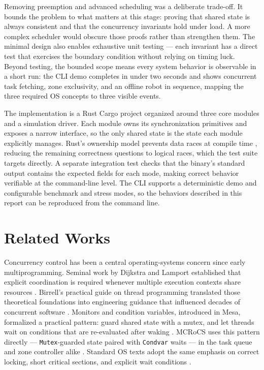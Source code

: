 \documentclass[11pt]{article}
\begin{document}
Removing preemption and advanced scheduling was a deliberate trade-off. It bounds the problem to what matters at this stage: proving that shared state is always consistent and that the concurrency invariants hold under load. A more complex scheduler would obscure those proofs rather than strengthen them. The minimal design also enables exhaustive unit testing --- each invariant has a direct test that exercises the boundary condition without relying on timing luck. Beyond testing, the bounded scope means every system behavior is observable in a short run: the CLI demo completes in under two seconds and shows concurrent task fetching, zone exclusivity, and an offline robot in sequence, mapping the three required OS concepts to three visible events.

The implementation is a Rust Cargo project organized around three core modules and a simulation driver. Each module owns its synchronization primitives and exposes a narrow interface, so the only shared state is the state each module explicitly manages. Rust's ownership model prevents data races at compile time \citep{klabnik2022}, reducing the remaining correctness questions to logical races, which the test suite targets directly. A separate integration test checks that the binary's standard output contains the expected fields for each mode, making correct behavior verifiable at the command-line level. The CLI supports a deterministic demo and configurable benchmark and stress modes, so the behaviors described in this report can be reproduced from the command line.

\section{Related Works}
Concurrency control has been a central operating-systems concern since early multiprogramming. Seminal work by Dijkstra and Lamport established that explicit coordination is required whenever multiple execution contexts share resources \citep{dijkstra1965,lamport1978}. Birrell's practical guide on thread programming translated those theoretical foundations into engineering guidance that influenced decades of concurrent software \citep{birrell1989}. Monitors and condition variables, introduced in Mesa, formalized a practical pattern: guard shared state with a mutex, and let threads wait on conditions that are re-evaluated after waking \citep{hoare1974,lampson1980}. MCRoCS uses this pattern directly --- \texttt{Mutex}-guarded state paired with \texttt{Condvar} waits --- in the task queue and zone controller alike \citep{rustmutex,rustcondvar}. Standard OS texts adopt the same emphasis on correct locking, short critical sections, and explicit wait conditions \citep{arpaci2018,silberschatz2018,tanenbaum2015}.
\end{document}
